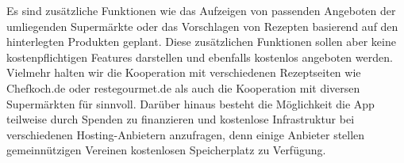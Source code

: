 Es sind zusätzliche Funktionen wie das Aufzeigen von passenden Angeboten der umliegenden Supermärkte oder das Vorschlagen von Rezepten basierend auf den hinterlegten Produkten geplant. Diese zusätzlichen Funktionen sollen aber keine kostenpflichtigen Features darstellen und ebenfalls kostenlos angeboten werden. Vielmehr halten wir die Kooperation mit verschiedenen Rezeptseiten wie Chefkoch.de oder restegourmet.de als auch die Kooperation mit diversen Supermärkten für sinnvoll. Darüber hinaus besteht die Möglichkeit die App teilweise durch Spenden zu finanzieren und kostenlose Infrastruktur bei verschiedenen Hosting-Anbietern anzufragen, denn einige Anbieter stellen gemeinnützigen Vereinen kostenlosen Speicherplatz zu Verfügung.





